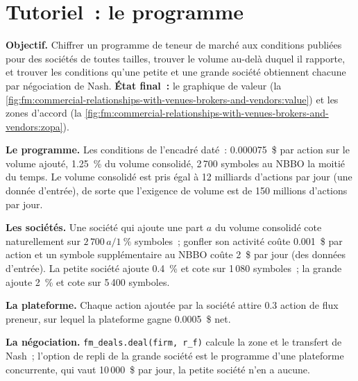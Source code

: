 \section{Tutoriel~: le programme}\label{tut:fm:commercial-relationships-with-venues-brokers-and-vendors:tut}

\begin{tutorial}
\textbf{Objectif.} Chiffrer un programme de teneur de marché aux conditions publiées pour des sociétés de toutes tailles, trouver le volume au-delà duquel il rapporte, et trouver les conditions
qu'une petite et une grande société obtiennent chacune par négociation de Nash. \textbf{État final~:} le graphique de valeur (la \cref{fig:fm:commercial-relationships-with-venues-brokers-and-vendors:value})
et les zones d'accord (la \cref{fig:fm:commercial-relationships-with-venues-brokers-and-vendors:zopa}).
\begin{tutsteps}
\item \textbf{Le programme.} Les conditions de l'encadré daté~: 0.000075~\$ par action sur le volume ajouté, 1.25~\% du volume consolidé, 2\,700 symboles au NBBO
la moitié du temps. Le volume consolidé est pris égal à 12 milliards d'actions par jour (une donnée d'entrée), de sorte que l'exigence de volume est de 150 millions d'actions par jour.
\item \textbf{Les sociétés.} Une société qui ajoute une part $a$ du volume consolidé cote naturellement sur $2\,700\,a/1~\%$ symboles~; gonfler son activité coûte 0.001~\$ par
action et un symbole supplémentaire au NBBO coûte 2~\$ par jour (des données d'entrée). La petite société ajoute 0.4~\% et cote sur 1\,080 symboles~; la grande ajoute 2~\% et cote
sur 5\,400 symboles.
\item \textbf{La plateforme.} Chaque action ajoutée par la société attire 0.3 action de flux preneur, sur lequel la plateforme gagne 0.0005~\$ net.
\item \textbf{La négociation.} \texttt{fm\_deals.deal(firm, r\_f)} calcule la zone et le transfert de Nash~; l'option de repli de la grande société est le programme d'une plateforme
concurrente, qui vaut 10\,000~\$ par jour, la petite société n'en a aucune.
\end{tutsteps}
\end{tutorial}

